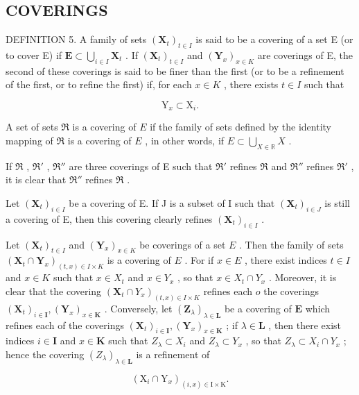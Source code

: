 \subsection{COVERINGS}

DEFINITION 5. A family of sets \((\mathbf{X}_t)_{t \in I}\) is said to be a covering of a set E (or to cover E) if \(\mathbf{E} \subset \bigcup_{i \in I} \mathbf{X}_t\) . If \((\mathbf{X}_t)_{t \in I}\) and \((\mathbf{Y}_x)_{x \in K}\) are coverings of E, the second of these coverings is said to be finer than the first (or to be a refinement of the first, or to refine the first) if, for each \(x \in K\) , there exists \(t \in I\) such that

\[
\mathrm{Y} _ {x} \subset \mathrm{X} _ {i}.
\]

A set of sets \(\Re\) is a covering of \(E\) if the family of sets defined by the identity mapping of \(\Re\) is a covering of \(E\) , in other words, if \(E \subset \bigcup_{X \in \mathbb{R}} X\) .

If \(\Re\) , \(\Re'\) , \(\Re''\) are three coverings of E such that \(\Re'\) refines \(\Re\) and \(\Re''\) refines \(\Re'\) , it is clear that \(\Re''\) refines \(\Re\) .

Let \((\mathbf{X}_t)_{i\in I}\) be a covering of E. If J is a subset of I such that \((\mathbf{X}_t)_{i\in J}\) is still a covering of E, then this covering clearly refines \((\mathbf{X}_t)_{i\in I}\) .

Let \((\mathbf{X}_t)_{t \in I}\) and \((\mathbf{Y}_x)_{x \in K}\) be coverings of a set \(E\) . Then the family of sets \((\mathbf{X}_t \cap \mathbf{Y}_x)_{(t,x) \in I \times K}\) is a covering of \(E\) . For if \(x \in E\) , there exist indices \(t \in I\) and \(x \in K\) such that \(x \in X_t\) and \(x \in Y_x\) , so that \(x \in X_t \cap Y_x\) . Moreover, it is clear that the covering \((\mathbf{X}_t \cap Y_x)_{(t,x) \in I \times K}\) refines each \(o\) the coverings \((\mathbf{X}_t)_{i\in \mathbf{I}}, (\mathbf{Y}_x)_{x\in \mathbf{K}}\) . Conversely, let \((\mathbf{Z}_{\lambda})_{\lambda \in \mathbf{L}}\) be a covering of \(\mathbf{E}\) which refines each of the coverings \((\mathbf{X}_t)_{i\in \mathbf{I}}, (\mathbf{Y}_x)_{x\in \mathbf{K}}\) ; if \(\lambda \in \mathbf{L}\) , then there exist indices \(i\in \mathbf{I}\) and \(x\in \mathbf{K}\) such that \(Z_{\lambda}\subset X_{i}\) and \(Z_{\lambda}\subset Y_{x}\) , so that \(Z_{\lambda}\subset X_{i}\cap Y_{x}\) ; hence the covering \((Z_{\lambda})_{\lambda \in \mathbf{L}}\) is a refinement of

\[
\left(\mathrm{X} _ {i} \cap \mathrm{Y} _ {x}\right) _ {(i, x) \in \mathrm{I} \times \mathrm{K}}.
\]

